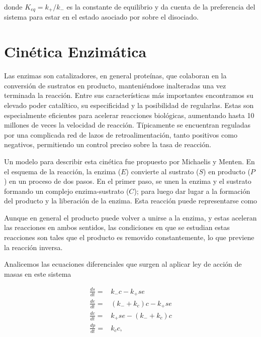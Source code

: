 \noindent donde $K_{eq} = k_+/k_-$ es la constante de equilibrio y da cuenta de la preferencia del sistema para estar en el estado asociado por sobre el disociado\cite{Keener1998}.


\section{Cinética Enzimática}
\label{sec:CineticaEnzimatica}
Las enzimas son catalizadores, en general proteínas, que colaboran en la conversión de sustratos en producto, manteniéndose inalteradas una vez terminada la reacción. Entre sus características más importantes encontramos su elevado poder catalítico, su especificidad y la posibilidad de regularlas. Estas son especialmente eficientes para acelerar reacciones biológicas, aumentando hasta 10 millones de veces la velocidad de reacción. Típicamente se encuentran reguladas por una complicada red de lazos de retroalimentación, tanto positivos como negativos, permitiendo un control preciso sobre la tasa de reacción\cite{Keener1998}.

Un modelo para describir esta cinética fue propuesto por Michaelis y Menten. En el esquema de la reacción, la enzima ($E$) convierte al sustrato ($S$) en producto ($P$) en un proceso de dos pasos. En el primer paso, se unen la enzima y el sustrato formando un complejo enzima-sustrato ($C$); para luego dar lugar a la formación del producto y la liberación de la enzima. Esta reacción puede representarse como

\begin{center}
\end{center}

\noindent Aunque en general el producto puede volver a unirse a la enzima, y estas aceleran las reacciones en ambos sentidos, las condiciones en que se estudian estas reacciones son tales que el producto es removido constantemente, lo que previene la reacción inversa.

Analicemos las ecuaciones diferenciales que surgen al aplicar ley de acción de masas en este sistema

\begin{align}
    \frac{ds}{dt} =& k_- c - k_+ se \label{eq:cin_sens}\\
    \frac{de}{dt} =& (k_- + k_c) c - k_+ se\\
    \frac{dc}{dt} =& k_+ se - (k_- + k_c) c\\
    \frac{dp}{dt} =& k_c c, \label{eq:cin_prod}\\
\end{align}

